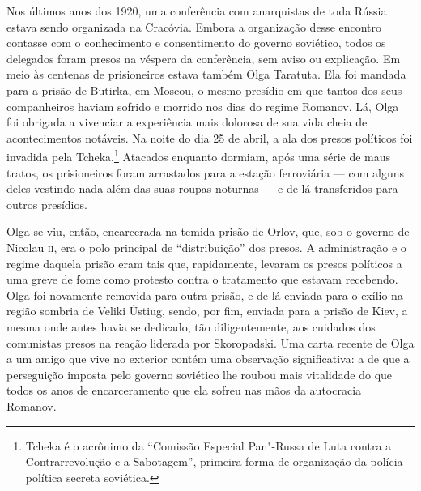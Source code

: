 Nos últimos anos dos 1920, uma conferência com anarquistas de toda
Rússia estava sendo organizada na Cracóvia. Embora
a organização desse encontro contasse com o conhecimento e consentimento do
governo soviético, todos os delegados foram presos na véspera da
conferência, sem aviso ou explicação. Em meio às centenas de
prisioneiros estava também Olga Taratuta. Ela foi mandada para a prisão
de Butirka, em Moscou, o mesmo presídio em que tantos dos seus
companheiros haviam sofrido e morrido nos dias do regime Romanov. Lá,
Olga foi obrigada a vivenciar a experiência mais dolorosa de sua vida
cheia de acontecimentos notáveis. Na noite do dia 25 de abril, a ala dos
presos políticos foi invadida pela Tcheka.\footnote{Tcheka é o acrônimo
  da ``Comissão Especial Pan"-Russa de Luta contra a Contrarrevolução e a
  Sabotagem'', primeira forma de organização da polícia política secreta
  soviética.} Atacados enquanto dormiam, após
uma série de maus tratos, os prisioneiros foram arrastados para a estação ferroviária --- com alguns deles vestindo nada além das suas roupas noturnas --- e de lá
transferidos para outros presídios.

Olga se viu, então, encarcerada na temida prisão de Orlov, que, sob o
governo de Nicolau \textsc{ii}, era o polo principal de ``distribuição'' dos
presos. A administração e o regime daquela prisão eram tais que,
rapidamente, levaram os presos políticos a uma greve de fome como
protesto contra o tratamento que estavam recebendo. Olga foi novamente
removida para outra prisão, e de lá enviada para o exílio na região
sombria de Veliki Ústiug, sendo, por fim, enviada para a prisão de Kiev,
a mesma onde antes havia se dedicado, tão diligentemente, aos
cuidados dos comunistas presos na reação liderada por Skoropadski. Uma
carta recente de Olga a um amigo que vive no exterior contém uma
observação significativa: a de que a perseguição imposta pelo governo
soviético lhe roubou mais vitalidade do que todos os anos de
encarceramento que ela sofreu nas mãos da autocracia Romanov.

